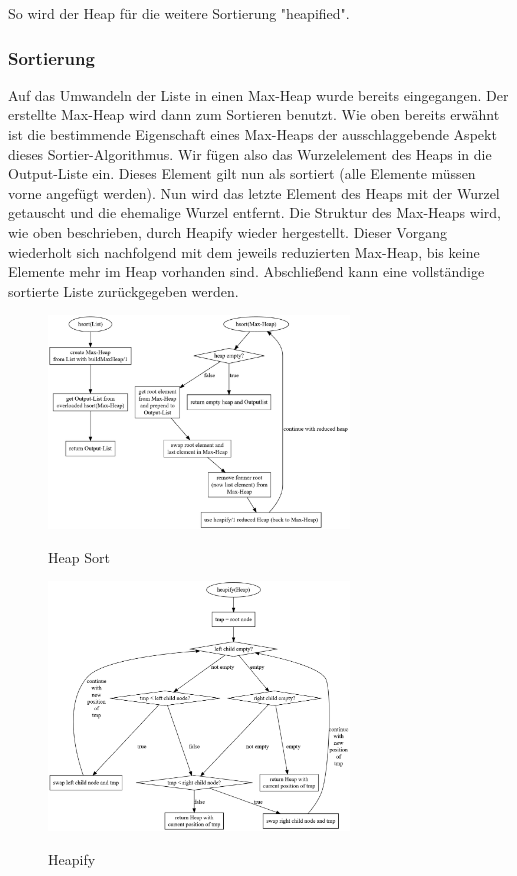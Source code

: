 \documentclass[11pt]{article}
\begin{document}
    So wird der Heap für die weitere Sortierung "heapified".

    \subsubsection{Sortierung}
    Auf das Umwandeln der Liste in einen Max-Heap wurde bereits eingegangen.
    Der erstellte Max-Heap wird dann zum Sortieren benutzt.
    Wie oben bereits erwähnt ist die bestimmende Eigenschaft eines Max-Heaps
    der ausschlaggebende Aspekt dieses Sortier-Algorithmus.
    Wir fügen also das Wurzelelement des Heaps in die Output-Liste ein.
    Dieses Element gilt nun als sortiert (alle Elemente müssen vorne angefügt
    werden).
    Nun wird das letzte Element des Heaps mit der Wurzel getauscht und die
    ehemalige Wurzel entfernt.
    Die Struktur des Max-Heaps wird, wie oben beschrieben, durch Heapify
    wieder hergestellt.
    Dieser Vorgang wiederholt sich nachfolgend mit dem jeweils reduzierten
    Max-Heap, bis keine Elemente mehr im Heap vorhanden sind.
    Abschließend kann eine vollständige sortierte Liste zurückgegeben werden.

    \begin{figure}[hbt]
        \caption{Heap Sort}
        \centering
        \includegraphics[width = 8cm]{hsort.pdf}\label{fig:hsort}
    \end{figure}

    \begin{figure}[hb]
        \caption{Heapify}
        \centering
        \includegraphics[width = 8cm]{heapify.pdf}\label{fig:heapify}
    \end{figure}
\end{document}

